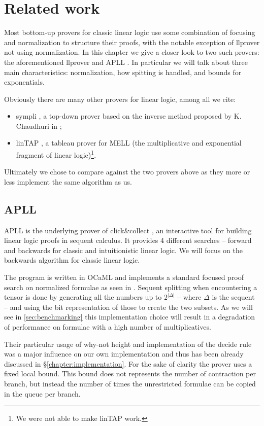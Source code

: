 \chapter{Related work}\label{chapter:related work}
Most bottom-up provers for classic linear logic use some combination of focusing and normalization to structure their proofs, with the notable exception of llprover \cite{llprover} not using normalization.	%
In this chapter we give a closer look to two such provers: the aforementioned llprover and APLL \cite{APLL}.
In particular we will talk about three main characteristics: normalization, how spitting is handled, and bounds for exponentials.

Obviously there are many other provers for linear logic, among all we cite: 
\begin{itemize}
	\item sympli \cite{sympli}, a top-down prover based on the inverse method proposed by K. Chaudhuri in \cite{inverse};
	\item linTAP \cite{linTAPwebsite, linTAP}, a tableau prover for MELL (the multiplicative and exponential fragment of linear logic)\footnote{We were not able to make linTAP work.}.
\end{itemize}
Ultimately we chose to compare against the two provers above as they more or less implement the same algorithm as us.

\section{APLL}\label{sec:apll}
APLL is the underlying prover of click\&collect \cite{clickAndCollect}, an interactive tool for building linear logic proofs in sequent calculus.
It provides 4 different searches -- forward and backwards for classic and intuitionistic linear logic. 
We will focus on the backwards algorithm for classic linear logic.

The program is written in OCaML and implements a standard focused proof search on normalized formulae as seen in \cite{LiangMiller}.
Sequent splitting when encountering a tensor is done by generating all the numbers up to $2^{|\Delta|}$ -- where $\Delta$ is the sequent -- and using the bit representation of those to create the two subsets.
As we will see in \ref{sec:benchmarking} this implementation choice will result in a degradation of performance on formulae with a high number of multiplicatives.

Their particular usage of why-not height and implementation of the decide rule was a major influence on our own implementation and thus has been already discussed in \S\ref{chapter:implementation}.
For the sake of clarity the prover uses a fixed local bound.
This bound does not represents the number of contraction per branch, but instead the number of times the unrestricted formulae can be copied in the queue per branch.

